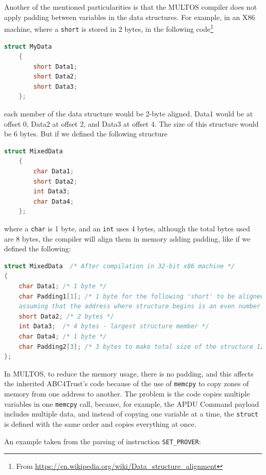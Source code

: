 Another of the mentioned particularities is that the MULTOS compiler does not apply padding between variables in the data structures. For example, in an X86 machine, where a \texttt{short} is stored in 2 bytes, in the following code\footnote{From \url{https://en.wikipedia.org/wiki/Data_structure_alignment}}

\begin{lstlisting}[language=C]
	struct MyData
	{
		short Data1;
		short Data2;
		short Data3;
	};
\end{lstlisting}

each member of the data structure would be 2-byte aligned. Data1 would be at offset 0, Data2 at offset 2, and Data3 at offset 4. The size of this structure would be 6 bytes. But if we defined the following structure

\begin{lstlisting}[language=C]
	struct MixedData
	{
		char Data1;
		short Data2;
		int Data3;
		char Data4;
	};
\end{lstlisting}

where a \texttt{char} is 1 byte, and an \texttt{int} uses 4 bytes, although the total bytes used are 8 bytes, the compiler will align them in memory adding padding, like if we defined the following:

\begin{lstlisting}[language=C]
struct MixedData  /* After compilation in 32-bit x86 machine */
{
	char Data1; /* 1 byte */
	char Padding1[1]; /* 1 byte for the following 'short' to be aligned on a 2 byte boundary
	assuming that the address where structure begins is an even number */
	short Data2; /* 2 bytes */
	int Data3;  /* 4 bytes - largest structure member */
	char Data4; /* 1 byte */
	char Padding2[3]; /* 3 bytes to make total size of the structure 12 bytes */
};
\end{lstlisting}



\hfil


In MULTOS, to reduce the memory usage, there is no padding, and this affects the inherited ABC4Trust's code because of the use of \texttt{memcpy} to copy zones of memory from one address to another. The problem is the code copies multiple variables in one \texttt{memcpy} call, because, for example, the APDU Command payload includes multiple data, and instead of copying one variable at a time, the \texttt{struct} is defined with the same order and copies everything at once.

An example taken from the parsing of instruction \texttt{SET\_PROVER}:

